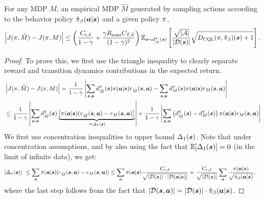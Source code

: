 \begin{lemma}
For any MDP $M$, an empirical MDP $\hat{M}$ generated by sampling actions according to the behavior policy $\hat{\pi}_\beta(\boldsymbol{a}|\boldsymbol{s})$ and a given policy $\pi$,
\begin{equation*}
    \left\vert J(\pi, \hat{M}) - J(\pi, M) \right\vert \leq \left({\frac{C_{r, \delta}}{1 - \gamma} + \frac{\gamma R_{\max} C_{T, \delta}}{(1 - \gamma)^2}} \right)\mathbb{E}_{\boldsymbol{s} \sim d^{\pi}_{\hat{M}}(\boldsymbol{s})}\left[ \frac{\sqrt{|\mathcal{A}|}}{{|\mathcal{D}(\boldsymbol{s})|}} \sqrt{ D_{\text{CQL}}(\pi, \hat{\pi}_\beta)(\boldsymbol{s}) + 1} \right].
\end{equation*}
\end{lemma}
\begin{proof}
To prove this, we first use the triangle inequality to clearly separate reward and transition dynamics contributions in the expected return.
\begin{align}
    & \left\vert J(\pi, \hat{M}) - J(\pi, M) \right\vert = \frac{1}{1 - \gamma} \left\vert \sum_{\boldsymbol{s}, \boldsymbol{a}} d^\pi_{\hat{M}}(\boldsymbol{s}) \pi(\boldsymbol{a}|\boldsymbol{s}) r_{\hat{M}}(\boldsymbol{s}, \boldsymbol{a}) -  \sum_{\boldsymbol{s}, \boldsymbol{a}} d^\pi_{{M}}(\boldsymbol{s}) \pi(\boldsymbol{a}|\boldsymbol{s}) r_{{M}}(\boldsymbol{s}, \boldsymbol{a}) \right\vert\\
    &\leq \frac{1}{1 - \gamma} \left\vert \sum_{\boldsymbol{s}, \boldsymbol{a}} d^\pi_{\hat{M}}(\boldsymbol{s}) \underbrace{\left[ \pi(\boldsymbol{a}|\boldsymbol{s}) ( r_{\hat{M}}(\boldsymbol{s}, \boldsymbol{a}) - r_M(\boldsymbol{s}, \boldsymbol{a}) \right]}_{:= \Delta_1(\boldsymbol{s})} \right\vert + \frac{1}{1 - \gamma} \left\vert \sum_{\boldsymbol{s}, \boldsymbol{a}} \left(d^\pi_{\hat{M}}(\boldsymbol{s}) - d^\pi_{{M}}(\boldsymbol{s}) \right) \pi(\boldsymbol{a}|\boldsymbol{s}) r_M(\boldsymbol{s}, \boldsymbol{a}) \right\vert
\end{align}
We first use concentration inequalities to upper bound $\Delta_1(\boldsymbol{s})$. Note that under concentration assumptions, and by also using the fact that $\mathbb{E}[\Delta_1(\boldsymbol{s})] = 0$ (in the limit of infinite data), we get:
\begin{align*}
    \vert\Delta_1(\boldsymbol{s})\vert &~ \leq \sum_{\boldsymbol{a}} \pi(\boldsymbol{a}|\boldsymbol{s}) \vert r_{\hat{M}}(\boldsymbol{s}, \boldsymbol{a}) - r_{M}(\boldsymbol{s}, \boldsymbol{a})\vert \leq \sum_{\boldsymbol{a}} \pi(\boldsymbol{a}|\boldsymbol{s}) \frac{C_{r, \delta}}{\sqrt{|\mathcal{D}(\boldsymbol{s})| \cdot |\mathcal{D}(\boldsymbol{a}|\boldsymbol{s})|}} = \frac{C_{r, \delta}}{\sqrt{|\mathcal{D}(\boldsymbol{s})|}} \sum_{\boldsymbol{a}} \frac{\pi(\boldsymbol{a}|\boldsymbol{s})}{\sqrt{\hat{\pi}_\beta(\boldsymbol{a}|\boldsymbol{s})}},
\end{align*}
where the last step follows from the fact that $|\mathcal{D}(\boldsymbol{s}, \boldsymbol{a})| = |\mathcal{D}(\boldsymbol{s})| \cdot \hat{\pi}_\beta(\boldsymbol{a}|\boldsymbol{s})$.


\end{proof}
